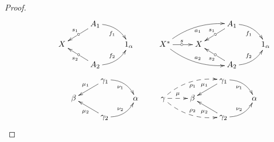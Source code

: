 \begin{proof}
$$
 \xymatrix@R=2.5ex
      {
    && A_1 \ar@/^0.7pc/[dr]_{f_1}
           \ar[ld]_{s_1} | \car
    \\ 
     & X %
    && 1_\alpha
    \\
    && A_2 \ar@/_0.7pc/[ur]^{f_2}
           \ar[ul]^{s_2} | \car           
       }
\hspace{6ex}       
\xymatrix@R=2.5ex
      {
    && A_1 \ar@/^0.7pc/[dr]_{f_1}
           \ar[ld]_{s_1} | \car
    \\ 
       X^* \ar[r]^{s} | \car 
         \ar@/^0.8pc/[rru]_{a_1} %
         \ar@/_0.8pc/[rrd]^{a_2} %
     & X %
    && 1_\alpha
    \\
    && A_2 \ar@/_0.7pc/[ur]^{f_2}
           \ar[ul]^{s_2} | \car           
       }
$$
$$
 \xymatrix@R=2ex
      {
    && \gamma_1 \ar@/^0.7pc/[dr]_{\nu_1}
           \ar[ld]_{\mu_1} %
    \\ 
     & \beta %
    && \alpha
    \\
    && \gamma_2 \ar@/_0.7pc/[ur]^{\nu_2}
           \ar[ul]^{\mu_2} %
       }
\hspace{5ex}
\xymatrix@R=2ex
      {
    && \gamma_1 \ar@/^0.7pc/[dr]_{\nu_1}
           \ar[ld]_{\mu_1} %
    \\ 
       \gamma \ar@{-->}[r]^{\mu} %
         \ar@{-->}@/^0.8pc/[rru]_{\rho_1} %
         \ar@{-->}@/_0.8pc/[rrd]^{\rho_2} %
     & \beta %
    && \alpha
    \\
    && \gamma_2 \ar@/_0.7pc/[ur]^{\nu_2}
           \ar[ul]^{\mu_2} %
       }
 $$


\end{proof}
